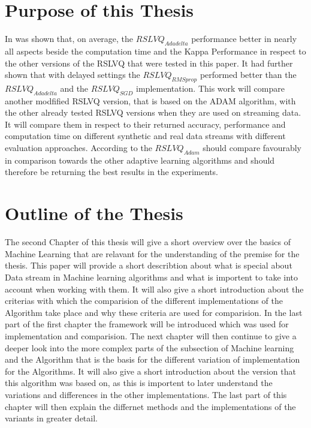 \documentclass[12pt,oneside,a4paper,parskip]{scrbook}
\begin{document}
\section{Purpose of this Thesis} 
In \cite{PassiveDriftonRSLVQ} was shown that, on average, the $RSLVQ_\textit{Adadelta}$ performance better in nearly
all aspects beside the computation time and the Kappa Performance in respect to the other versions of the RSLVQ 
that were tested in this paper.
It had further shown that with delayed settings the $RSLVQ_\textit{RMSprop}$ performed better than the $RSLVQ_\textit{Adadelta}$
and the $RSLVQ_\textit{SGD}$ implementation.
This work will compare another modfified RSLVQ version, that is based on the ADAM algorithm, with the other already tested
RSLVQ versions when they are used on streaming data. It will compare them in respect to their returned accuracy,
performance and computation time on different synthetic and real data streams with different evaluation approaches.
According to \cite{Kingma2014AdamAM} the $RSLVQ_\textit{Adam}$ should compare favourably in comparison towards the
other adaptive learning algorithms and should therefore be returning the best results in the experiments.


\section{Outline of the Thesis} 

The second Chapter of this thesis will give a short overview over the basics of Machine Learning that are relavant for
the understanding of the premise for the thesis. This paper will provide a short describtion about what is special about Data stream 
in Machine learning algorithms and what is importent to take into account when working with them.
It will also give a short introduction about the criterias with which the comparision of the different implementations 
of the Algorithm take place and why these criteria are used for  comparision.
In the last part of the first chapter the framework will be introduced which was used for implementation and comparision.
The next chapter will then continue to give a deeper look into the more complex parts of the subsection of Machine learning 
and the Algorithm that is the basis for the different variation of implementation for the Algorithms.
It will also give a short introduction about the version that this algorithm was based on, as this is importent to later understand
the variations and differences in the other implementations.
The last part of this chapter will then explain the differnet methods and the implementations of the variants in greater detail.
\end{document}
